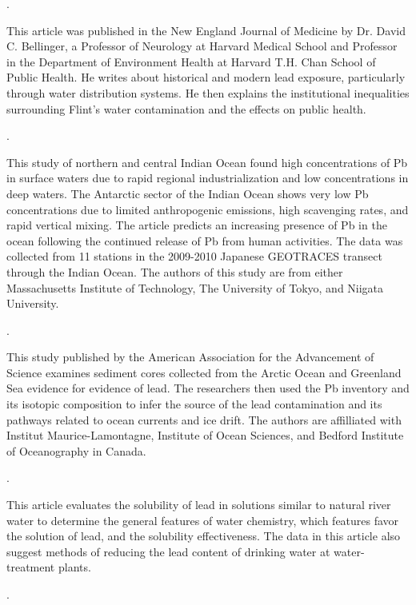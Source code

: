 \documentclass{article}
\begin{document}
\medskip
\noindent {}.
\medskip

This article was published in the New England Journal of Medicine by Dr. David C. Bellinger, a Professor of Neurology at Harvard Medical School and Professor in the Department of Environment Health at Harvard T.H. Chan School of Public Health. He writes about historical and modern lead exposure, particularly through water distribution systems. He then explains the institutional inequalities surrounding Flint's water contamination and the effects on public health. 

\medskip
\noindent {}.
\medskip

This study of northern and central Indian Ocean found high concentrations of Pb in surface waters due to rapid regional industrialization and low concentrations in deep waters. The Antarctic sector of the Indian Ocean shows very low Pb concentrations due to limited anthropogenic emissions, high scavenging rates, and rapid vertical mixing. The article predicts an increasing presence of Pb in the ocean following the continued release of Pb from human activities. The data was collected from 11 stations in the 2009-2010 Japanese GEOTRACES transect through the Indian Ocean. The authors of this study are from either Massachusetts Institute of Technology, The University of Tokyo, and Niigata University. 

\medskip
\noindent {}.
\medskip

This study published by the American Association for the Advancement of Science examines sediment cores collected from the Arctic Ocean and Greenland Sea evidence for evidence of lead. The researchers then used the Pb inventory and its isotopic composition to infer the source of the lead contamination and its pathways related to ocean currents and ice drift. The authors are affilliated with Institut Maurice-Lamontagne, Institute of Ocean Sciences, and Bedford Institute of Oceanography in Canada.

\medskip
\noindent {}.
\bigskip

This article evaluates the solubility of lead in solutions similar to natural river water to determine the general features of water chemistry, which features favor the solution of lead, and the solubility effectiveness. The data in this article also suggest methods of reducing the lead content of drinking water at water-treatment plants. 

\medskip
\noindent {}.
\medskip
\end{document}
